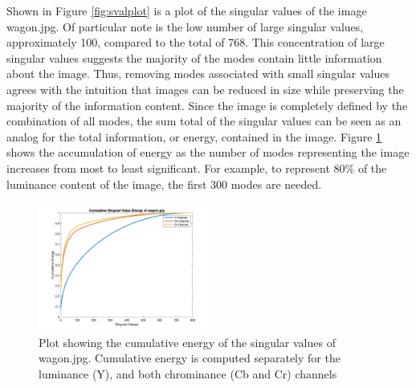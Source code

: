 \documentclass[conference]{IEEEtran}
\begin{document}
    Shown in Figure \ref{fig:svalplot} is a plot of the singular values of the image wagon.jpg. Of particular note is the low number of large singular values, approximately 100, compared to the total of 768. This concentration of large singular values suggests the majority of the modes contain little information about the image. Thus, removing modes associated with small singular values agrees with the intuition that images can be reduced in size while preserving the majority of the information content. Since the image is completely defined by the combination of all modes, the sum total of the singular values can be seen as an analog for the total information, or energy, contained in the image. Figure \ref{fig:svalenergyplot} shows the accumulation of energy as the number of modes representing the image increases from most to least significant. For example, to represent 80\% of the luminance content of the image, the first 300 modes are needed.



    \begin{figure}[t]
    \includegraphics[width=0.5\textwidth]{sv_energy_wagon}
    \caption{Plot showing the cumulative energy of the singular values of wagon.jpg. Cumulative energy is computed separately for the luminance (Y), and both chrominance (Cb and Cr) channels}
    \label{fig:svalenergyplot}
    \end{figure}
    
\end{document}
